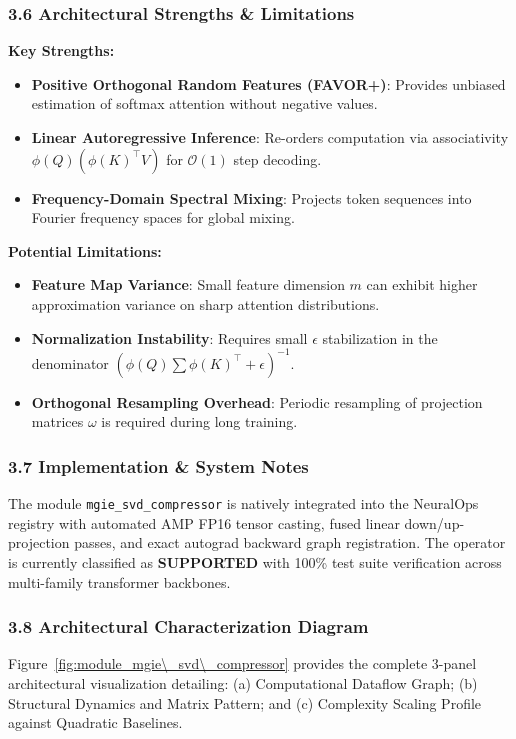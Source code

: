 \subsubsection*{3.6 Architectural Strengths \& Limitations}
\textbf{Key Strengths:}
\begin{itemize}
    \item \textbf{Positive Orthogonal Random Features (FAVOR+)}: Provides unbiased estimation of softmax attention without negative values.
    \item \textbf{Linear Autoregressive Inference}: Re-orders computation via associativity $\phi(Q) (\phi(K)^\top V)$ for $\mathcal{O}(1)$ step decoding.
    \item \textbf{Frequency-Domain Spectral Mixing}: Projects token sequences into Fourier frequency spaces for global mixing.
\end{itemize}

\textbf{Potential Limitations:}
\begin{itemize}
    \item \textbf{Feature Map Variance}: Small feature dimension $m$ can exhibit higher approximation variance on sharp attention distributions.
    \item \textbf{Normalization Instability}: Requires small $\epsilon$ stabilization in the denominator $(\phi(Q) \sum \phi(K)^\top + \epsilon)^{-1}$.
    \item \textbf{Orthogonal Resampling Overhead}: Periodic resampling of projection matrices $\omega$ is required during long training.
\end{itemize}

\subsubsection*{3.7 Implementation \& System Notes}
The module \texttt{mgie\_svd\_compressor} is natively integrated into the NeuralOps registry with automated AMP FP16 tensor casting, fused linear down/up-projection passes, and exact autograd backward graph registration. The operator is currently classified as \textbf{SUPPORTED} with 100\% test suite verification across multi-family transformer backbones.

\subsubsection*{3.8 Architectural Characterization Diagram}
Figure~\ref{fig:module_mgie\_svd\_compressor} provides the complete 3-panel architectural visualization detailing: (a) Computational Dataflow Graph; (b) Structural Dynamics and Matrix Pattern; and (c) Complexity Scaling Profile against Quadratic Baselines.

